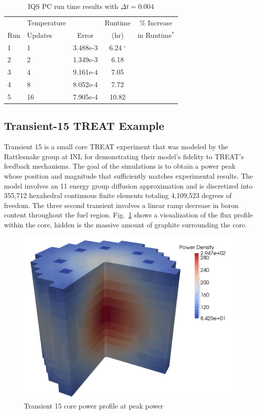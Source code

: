 \documentclass{anstrans}
\newcommand{\fig}[1]{Fig.~\ref{#1}}                      %
\begin{document}
\begin{table}[!htbp]
\begin{center}
\begin{tabular}{|l|l|ccc|}
\hline
	&  Temperature 	&  		& Runtime 	& \% Increase	\\
Run	&  Updates 	& Error & (hr)		& in Runtime$^*$\\
\hline
1	& 1		& 3.488e-3 	& 6.24 `&	\\
2	& 2		& 1.349e-3 	& 6.18	& 	\\
3 	& 4 	& 9.161e-4 	& 7.05	&	\\
4 	& 8 	& 8.052e-4 	& 7.72	&	\\
5 	& 16	& 7.905e-4 	& 10.82	&	\\
\hline
\end{tabular}
\end{center}
\caption{IQS PC run time results with $\Delta t = 0.004$}
\label{tab:iqspc_lra}
\end{table}

\subsection{Transient-15 TREAT Example}

Transient 15 is a small core TREAT experiment that was modeled by the Rattlesnake group at INL for demonstrating their model's fidelity to TREAT’s feedback mechanisms. The goal of the simulations is to obtain a power peak whose position and magnitude that sufficiently matches experimental results.  The model involves an 11 energy group diffusion approximation and is discretized into 355,712 hexahedral continuous finite elements totaling 4,109,523 degrees of freedom.  The three second transient involves a linear ramp decrease in boron content throughout the fuel region.  \fig{fig:Tran15} shows a visualization of the flux profile within the core, hidden is the massive amount of graphite surrounding the core.   

\begin{figure}[htbp!]
\centering
\includegraphics[width=\linewidth]{Tran15_core2.png}
\caption{Transient 15 core power profile at peak power}
\label{fig:Tran15}
\end{figure}
\end{document}
